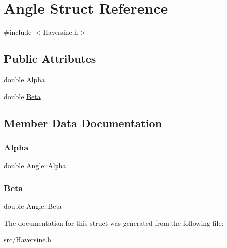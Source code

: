 \hypertarget{struct_angle}{}\section{Angle Struct Reference}
\label{struct_angle}


{\ttfamily \#include $<$Haversine.\+h$>$}

\subsection*{Public Attributes}
\begin{DoxyCompactItemize}
\item 
double \hyperlink{struct_angle_a411a4c89578b953db9b6eea3df11b4ff}{Alpha}
\item 
double \hyperlink{struct_angle_a1ccfa2647c9f504d9f2687778e2b2d30}{Beta}
\end{DoxyCompactItemize}


\subsection{Member Data Documentation}
\mbox{\label{struct_angle_a411a4c89578b953db9b6eea3df11b4ff}} 
\subsubsection{\texorpdfstring{Alpha}{Alpha}}
{\footnotesize\ttfamily double Angle\+::\+Alpha}

\mbox{\label{struct_angle_a1ccfa2647c9f504d9f2687778e2b2d30}} 
\subsubsection{\texorpdfstring{Beta}{Beta}}
{\footnotesize\ttfamily double Angle\+::\+Beta}



The documentation for this struct was generated from the following file\+:\begin{DoxyCompactItemize}
\item 
src/\hyperlink{_haversine_8h}{Haversine.\+h}\end{DoxyCompactItemize}
